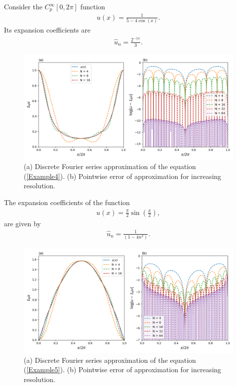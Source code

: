 	\begin{example}
	    Consider the $C^{\infty}_p [0, 2 \pi]$ function
    	\begin{align}
    		\label{Example4}
    	    u(x) = \frac{1}{5 - 4 \cos(x)}.
    	\end{align}
    	Its expansion coefficients are
    	\begin{align*}
    	     \hat{u}_{n} = \frac{2^{-|n|}}{3}.
    	\end{align*}
    	\begin{figure}[H]
        \includegraphics[width=\textwidth]{preliminaries/figures/example23.png}
        \caption{(a) Discrete Fourier series approximation of the equation (\ref{Example4}). (b) Pointwise error of approximation for increasing resolution.}
        \label{fig3}
        \end{figure}
	\end{example} 
	
	\begin{example}
	    The expansion coefficients of the function
    	\begin{align}
    		\label{Example5}
    	    u(x) = \frac{\pi}{2} \sin(\frac{x}{2}),
    	\end{align}
   		are given by
    	\begin{align*}
    	     \hat{u}_{n} = \frac{1}{(1 - 4n^2)}.
    	\end{align*}
    	\begin{figure}[H]
        \includegraphics[width=\textwidth]{preliminaries/figures/example24.png}
        \caption{(a) Discrete Fourier series approximation of the equation (\ref{Example5}). (b) Pointwise error of approximation for increasing resolution.}
        \label{fig4}
        \end{figure}
	\end{example} 
	
